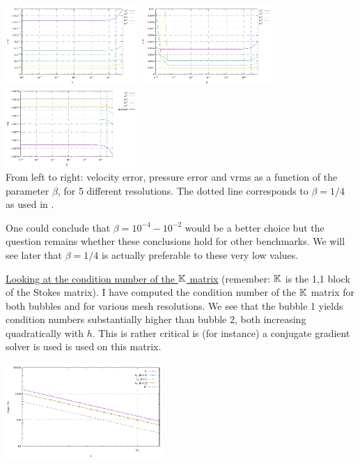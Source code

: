 \begin{center}
\includegraphics[width=5cm]{python_codes/fieldstone_72/results/mms/errors_v_beta2}
\includegraphics[width=5cm]{python_codes/fieldstone_72/results/mms/errors_p_beta2}
\includegraphics[width=5cm]{python_codes/fieldstone_72/results/mms/vrms_beta2}\\
{\captionfont From left to right: velocity error, pressure error and vrms as a function 
of the parameter $\beta$, for 5 different resolutions. The dotted line corresponds to $\beta=1/4$ as used in \cite{lami17}.}
\end{center}

One could conclude that $\beta=10^{-4}-10^{-2}$ 
would be a better choice but the question remains whether these
conclusions hold for other benchmarks. We will see later 
that $\beta=1/4$ is actually preferable to these very low values.

\vspace{.4cm}

\underline{Looking at the condition number of the ${\mathbb{K}}$ matrix} (remember: ${\mathbb{K}}$ is the 1,1 block of the
Stokes matrix). 
I have computed the condition number of the ${\mathbb{K}}$ matrix for both bubbles and for various mesh resolutions. 
We see that the bubble 1 yields condition numbers substantially higher than bubble 2, both increasing 
quadratically with $h$. This is rather critical is (for instance) a conjugate gradient solver is used 
is used on this matrix.

\begin{center}
\includegraphics[width=6cm]{python_codes/fieldstone_72/results/mms/eigenvalues/e}
\end{center}

